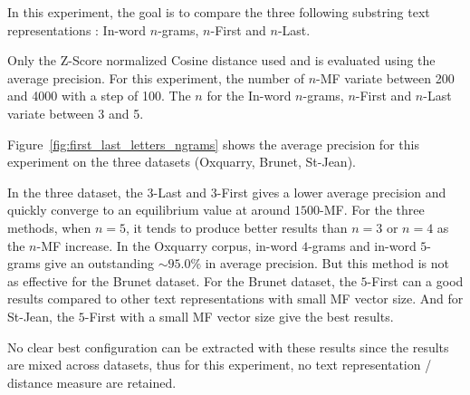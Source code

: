 In this experiment, the goal is to compare the three following substring text representations : In-word $n$-grams, $n$-First and $n$-Last.

Only the Z-Score normalized Cosine distance used and is evaluated using the average precision.
For this experiment, the number of $n$-MF variate between 200 and 4000 with a step of 100.
The $n$ for the In-word $n$-grams, $n$-First and $n$-Last variate between 3 and 5.

Figure~\ref{fig:first_last_letters_ngrams} shows the average precision for this experiment on the three datasets (Oxquarry, Brunet, St-Jean).

In the three dataset, the $3$-Last and $3$-First gives a lower average precision and quickly converge to an equilibrium value at around $1500$-MF.
For the three methods, when $n = 5$, it tends to produce better results than $n = 3$ or $n = 4$ as the $n$-MF increase.
In the Oxquarry corpus, in-word $4$-grams and in-word $5$-grams give an outstanding $\sim 95.0\%$ in average precision.
But this method is not as effective for the Brunet dataset.
For the Brunet dataset, the $5$-First can a good results compared to other text representations with small MF vector size.
And for St-Jean, the $5$-First with a small MF vector size give the best results.

No clear best configuration can be extracted with these results since the results are mixed across datasets, thus for this experiment, no text representation / distance measure are retained.

